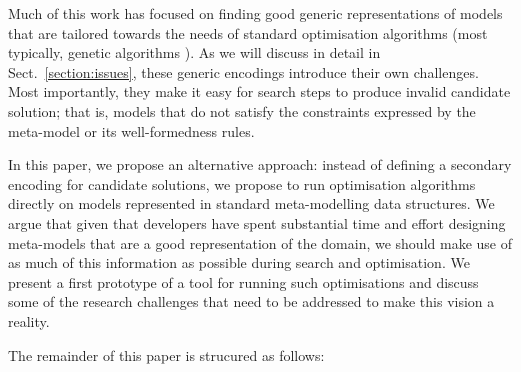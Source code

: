 	Much of this work has focused on finding good generic representations of models that are tailored towards the needs of standard optimisation algorithms (most
	typically, genetic algorithms \cite{GA}). As we will discuss in detail in Sect.~\ref{section:issues}, these generic encodings introduce their own challenges.
	Most importantly, they make it easy for search steps to produce invalid candidate solution; that is, models that do not satisfy the constraints expressed by the
	meta-model or its well-formedness rules.
	
	In this paper, we propose an alternative approach: instead of defining a secondary encoding for candidate solutions, we propose to run optimisation algorithms
	directly on models represented in standard meta-modelling data structures. We argue that given that developers have spent substantial time and effort designing
	meta-models that are a good representation of the domain, we should make use of as much of this information as possible during search and optimisation. We
	present a first prototype of a tool for running such optimisations and discuss some of the research challenges that need to be addressed to make this vision a
	reality.
	
	The remainder of this paper is strucured as follows: \draft{}